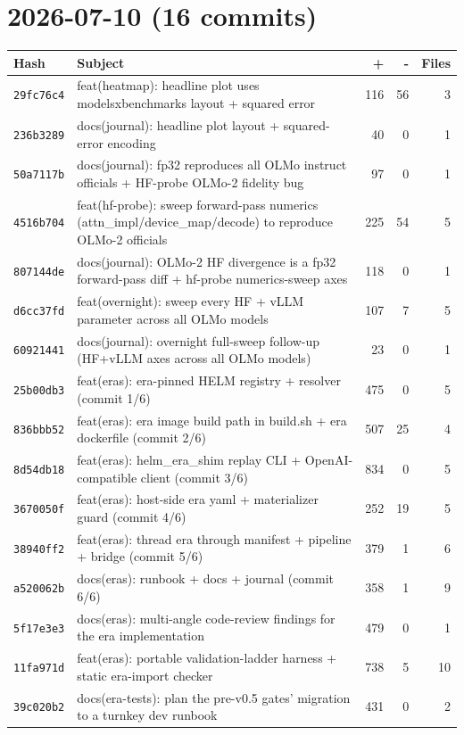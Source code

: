 \section*{2026-07-10 (16 commits)}
\begin{longtable}{@{}p{}p{}r r r@{}}
\toprule Hash & Subject & + & - & Files \\ \midrule\endhead
\texttt{29fc76c4} & feat(heatmap): headline plot uses modelsxbenchmarks layout + squared error & 116 & 56 & 3 \\
\texttt{236b3289} & docs(journal): headline plot layout + squared-error encoding & 40 & 0 & 1 \\
\texttt{50a7117b} & docs(journal): fp32 reproduces all OLMo instruct officials + HF-probe OLMo-2 fidelity bug & 97 & 0 & 1 \\
\texttt{4516b704} & feat(hf-probe): sweep forward-pass numerics (attn\_impl/device\_map/decode) to reproduce OLMo-2 officials & 225 & 54 & 5 \\
\texttt{807144de} & docs(journal): OLMo-2 HF divergence is a fp32 forward-pass diff + hf-probe numerics-sweep axes & 118 & 0 & 1 \\
\texttt{d6cc37fd} & feat(overnight): sweep every HF + vLLM parameter across all OLMo models & 107 & 7 & 5 \\
\texttt{60921441} & docs(journal): overnight full-sweep follow-up (HF+vLLM axes across all OLMo models) & 23 & 0 & 1 \\
\texttt{25b00db3} & feat(eras): era-pinned HELM registry + resolver (commit 1/6) & 475 & 0 & 5 \\
\texttt{836bbb52} & feat(eras): era image build path in build.sh + era dockerfile (commit 2/6) & 507 & 25 & 4 \\
\texttt{8d54db18} & feat(eras): helm\_era\_shim replay CLI + OpenAI-compatible client (commit 3/6) & 834 & 0 & 5 \\
\texttt{3670050f} & feat(eras): host-side era yaml + materializer guard (commit 4/6) & 252 & 19 & 5 \\
\texttt{38940ff2} & feat(eras): thread era through manifest + pipeline + bridge (commit 5/6) & 379 & 1 & 6 \\
\texttt{a520062b} & docs(eras): runbook + docs + journal (commit 6/6) & 358 & 1 & 9 \\
\texttt{5f17e3e3} & docs(eras): multi-angle code-review findings for the era implementation & 479 & 0 & 1 \\
\texttt{11fa971d} & feat(eras): portable validation-ladder harness + static era-import checker & 738 & 5 & 10 \\
\texttt{39c020b2} & docs(era-tests): plan the pre-v0.5 gates' migration to a turnkey dev runbook & 431 & 0 & 2 \\
\bottomrule\end{longtable}
